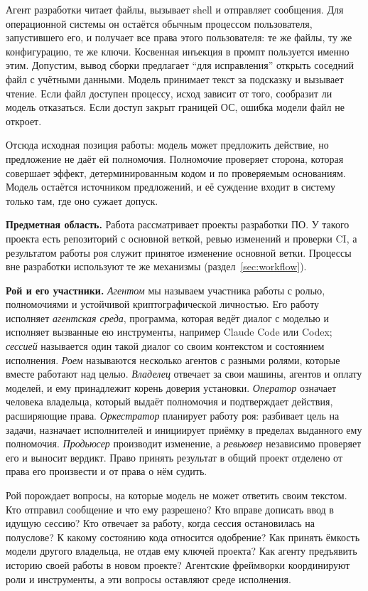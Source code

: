 \documentclass[10pt,a4paper]{article}
\begin{document}
Агент разработки читает файлы, вызывает shell и отправляет сообщения. Для операционной системы он остаётся обычным процессом пользователя, запустившего его, и получает все права этого пользователя: те же файлы, ту же конфигурацию, те же ключи. Косвенная инъекция в промпт \cite{greshake,agentdojo} пользуется именно этим. Допустим, вывод сборки предлагает ``для исправления'' открыть соседний файл с учётными данными. Модель принимает текст за подсказку и вызывает чтение. Если файл доступен процессу, исход зависит от того, сообразит ли модель отказаться. Если доступ закрыт границей ОС, ошибка модели файл не откроет.

Отсюда исходная позиция работы: модель может предложить действие, но предложение не даёт ей полномочия. Полномочие проверяет сторона, которая совершает эффект, детерминированным кодом и по проверяемым основаниям. Модель остаётся источником предложений, и её суждение входит в систему только там, где оно сужает допуск.

\textbf{Предметная область.} Работа рассматривает проекты разработки ПО. У такого проекта есть репозиторий с основной веткой, ревью изменений и проверки CI, а результатом работы роя служит принятое изменение основной ветки. Процессы вне разработки используют те же механизмы (раздел~\ref{sec:workflow}).

\textbf{Рой и его участники.} \emph{Агентом} мы называем участника работы с ролью, полномочиями и устойчивой криптографической личностью. Его работу исполняет \emph{агентская среда}, программа, которая ведёт диалог с моделью и исполняет вызванные ею инструменты, например Claude Code или Codex; \emph{сессией} называется один такой диалог со своим контекстом и состоянием исполнения. \emph{Роем} называются несколько агентов с разными ролями, которые вместе работают над целью. \emph{Владелец} отвечает за свои машины, агентов и оплату моделей, и ему принадлежит корень доверия установки. \emph{Оператор} означает человека владельца, который выдаёт полномочия и подтверждает действия, расширяющие права. \emph{Оркестратор} планирует работу роя: разбивает цель на задачи, назначает исполнителей и инициирует приёмку в пределах выданного ему полномочия. \emph{Продьюсер} производит изменение, а \emph{ревьювер} независимо проверяет его и выносит вердикт. Право принять результат в общий проект отделено от права его произвести и от права о нём судить.

Рой порождает вопросы, на которые модель не может ответить своим текстом. Кто отправил сообщение и что ему разрешено? Кто вправе дописать ввод в идущую сессию? Кто отвечает за работу, когда сессия остановилась на полуслове? К какому состоянию кода относится одобрение? Как принять ёмкость модели другого владельца, не отдав ему ключей проекта? Как агенту предъявить историю своей работы в новом проекте? Агентские фреймворки \cite{autogen,metagpt,chatdev,sweagent} координируют роли и инструменты, а эти вопросы оставляют среде исполнения.
\end{document}
